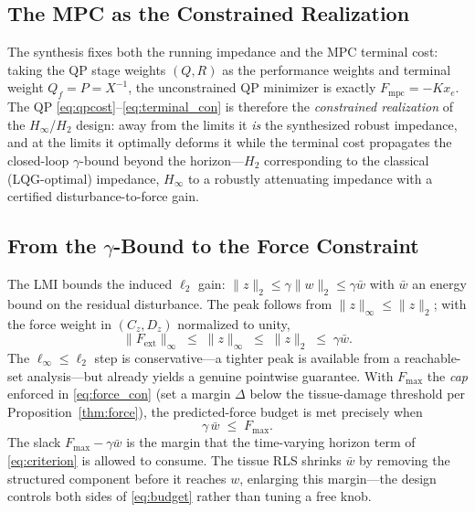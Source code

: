 \subsection{The MPC as the Constrained Realization}

The synthesis fixes both the running impedance and the MPC terminal cost: taking the QP stage weights $(Q,R)$ as the performance weights and terminal weight $Q_f=P=X^{-1}$, the unconstrained QP minimizer is exactly $F_{\text{mpc}}=-Kx_e$. The QP \eqref{eq:qpcost}--\eqref{eq:terminal_con} is therefore the \emph{constrained realization} of the $H_\infty$/$H_2$ design: away from the limits it \emph{is} the synthesized robust impedance, and at the limits it optimally deforms it while the terminal cost propagates the closed-loop $\gamma$-bound beyond the horizon---$H_2$ corresponding to the classical (LQG-optimal) impedance, $H_\infty$ to a robustly attenuating impedance with a certified disturbance-to-force gain.

\subsection{From the $\gamma$-Bound to the Force Constraint}\label{sec:gamma}

The LMI bounds the induced $\ell_2$ gain: $\|z\|_2\le\gamma\|w\|_2 \le \gamma\bar w$ with $\bar w$ an energy bound on the residual disturbance. The peak follows from $\|z\|_\infty\le\|z\|_2$; with the force weight in $(C_z,D_z)$ normalized to unity,
\begin{equation*}
\|F_{\text{ext}}\|_\infty \;\le\; \|z\|_\infty \;\le\; \|z\|_2 \;\le\; \gamma\bar w .
\end{equation*}
The $\ell_\infty\!\le\!\ell_2$ step is conservative---a tighter peak is available from a reachable-set analysis---but already yields a genuine pointwise guarantee. With $F_{\max}$ the \emph{cap} enforced in \eqref{eq:force_con} (set a margin $\Delta$ below the tissue-damage threshold per Proposition~\ref{thm:force}), the predicted-force budget is met precisely when
\begin{equation}
\gamma\,\bar w \;\le\; F_{\max}.
\label{eq:budget}
\end{equation}
The slack $F_{\max}-\gamma\bar w$ is the margin that the time-varying horizon term of \eqref{eq:criterion} is allowed to consume. The tissue RLS shrinks $\bar w$ by removing the structured component before it reaches $w$, enlarging this margin---the design controls both sides of \eqref{eq:budget} rather than tuning a free knob.

